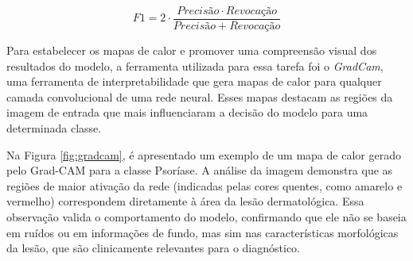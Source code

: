 \begin{equation}
  F1 = 2 \cdot \frac{Precisão \cdot Revocação}{Precisão + Revocação}
  \label{eq:f1_score}
\end{equation}

Para estabelecer os mapas de calor e promover uma compreensão visual dos resultados do modelo, a ferramenta utilizada para essa tarefa foi o \textit{GradCam}, uma ferramenta de interpretabilidade que gera mapas de calor para qualquer camada convolucional de uma rede neural. Esses mapas destacam as regiões da imagem de entrada que mais influenciaram a decisão do modelo para uma determinada classe.

Na Figura \ref{fig:gradcam}, é apresentado um exemplo de um mapa de calor gerado pelo Grad-CAM para a classe Psoríase. A análise da imagem demonstra que as regiões de maior ativação da rede (indicadas pelas cores quentes, como amarelo e vermelho) correspondem diretamente à área da lesão dermatológica. Essa observação valida o comportamento do modelo, confirmando que ele não se baseia em ruídos ou em informações de fundo, mas sim nas características morfológicas da lesão, que são clinicamente relevantes para o diagnóstico.

